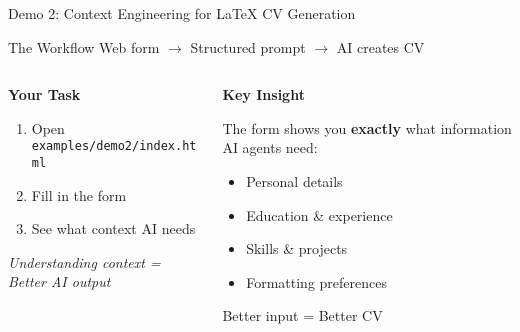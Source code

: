 \documentclass[aspectratio=169]{beamer}
\begin{document}
\begin{frame}{Demo 2: Context Engineering for LaTeX CV Generation}
  \begin{block}{The Workflow}
    Web form $\rightarrow$ Structured prompt $\rightarrow$ AI creates CV
  \end{block}

  \vspace{0.5cm}

  \begin{columns}[T]
    \begin{column}{0.48\textwidth}
      \centering
      \large\bfseries
      \textcolor{conesaTeal}{Your Task}

      \vspace{0.5cm}
      \normalsize

      \begin{enumerate}
        \item Open \texttt{examples/demo2/index.html}
        \item Fill in the form
        \item See what context AI needs
      \end{enumerate}

      \vspace{0.3cm}
      \small
      \textit{Understanding context = Better AI output}
    \end{column}
    \begin{column}{0.48\textwidth}
      \centering
      \large\bfseries
      \textcolor{conesaOrange}{Key Insight}

      \vspace{0.5cm}
      \normalsize

      The form shows you \textbf{exactly} what information AI agents need:

      \vspace{0.3cm}
      \begin{itemize}
        \item Personal details
        \item Education \& experience
        \item Skills \& projects
        \item Formatting preferences
      \end{itemize}

      \vspace{0.3cm}
      \small
      Better input = Better CV
    \end{column}
  \end{columns}
\end{frame}
\end{document}
